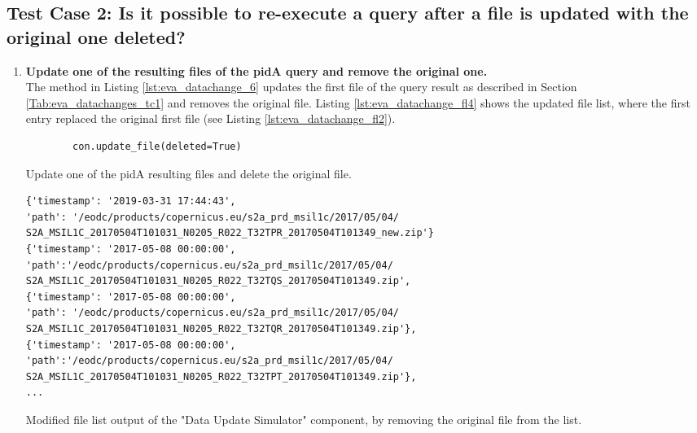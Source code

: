 \documentclass[draft,final]{vutinfth} %
\newenvironment{code}{\captionsetup{type=listing}}{}
\begin{document}
\subsection{Test Case 2: Is it possible to re-execute a query after a file is updated with the original one deleted?}

\begin{enumerate}
	\setcounter{enumi}{+1}
	\item \textbf{Update one of the resulting files of the pidA query and remove the original one.}\\ 
	The method in Listing \ref{lst:eva_datachange_6} updates the first file of the query result as described in Section \ref{Tab:eva_datachanges_tc1} and removes the original file. Listing \ref{lst:eva_datachange_fl4} shows the updated file list, where the first entry replaced the original first file (see Listing \ref{lst:eva_datachange_fl2}).
	\begin{code}
		\begin{verbatim}
		con.update_file(deleted=True)
		\end{verbatim}
		\caption{Update one of the pidA resulting files and delete the original file.}
		\label{lst:eva_datachange_6}
	\end{code}
	
	\begin{code}
		\begin{verbatim} 
{'timestamp': '2019-03-31 17:44:43', 
'path': '/eodc/products/copernicus.eu/s2a_prd_msil1c/2017/05/04/
S2A_MSIL1C_20170504T101031_N0205_R022_T32TPR_20170504T101349_new.zip'}
{'timestamp': '2017-05-08 00:00:00',
'path':'/eodc/products/copernicus.eu/s2a_prd_msil1c/2017/05/04/
S2A_MSIL1C_20170504T101031_N0205_R022_T32TQS_20170504T101349.zip', 
{'timestamp': '2017-05-08 00:00:00', 
'path': '/eodc/products/copernicus.eu/s2a_prd_msil1c/2017/05/04/
S2A_MSIL1C_20170504T101031_N0205_R022_T32TQR_20170504T101349.zip'}, 
{'timestamp': '2017-05-08 00:00:00',
'path':'/eodc/products/copernicus.eu/s2a_prd_msil1c/2017/05/04/
S2A_MSIL1C_20170504T101031_N0205_R022_T32TPT_20170504T101349.zip'},
...
		\end{verbatim}
		\caption{Modified file list output of the "Data Update Simulator" component, by removing the original file from the list.}
		\label{lst:eva_datachange_fl4}
	\end{code}	
	

\end{enumerate}
\end{document}
